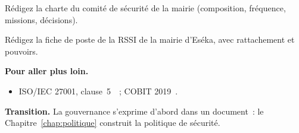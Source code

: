 \begin{boxexo}[title={\ding{45}\quad Exercice~4.9. Charte de comité \niveauexpert}]
Rédigez la charte du comité de sécurité de la mairie (composition, fréquence,
missions, décisions).
\end{boxexo}

\begin{boxexo}[title={\ding{45}\quad Exercice~4.10. Fiche de poste \niveauexpert}]
Rédigez la fiche de poste de la RSSI de la mairie d'Eséka, avec rattachement et
pouvoirs.
\end{boxexo}

\bigskip

\begin{boxinfo}
\textbf{Pour aller plus loin.}
\begin{itemize}
    \item ISO/IEC 27001, clause~5~\cite{iso27001}~; COBIT 2019~\cite{cobit2019}.
\end{itemize}
\end{boxinfo}

\begin{boxinfo}
\textbf{Transition.} La gouvernance s'exprime d'abord dans un document~: le
Chapitre~\ref{chap:politique} construit la politique de sécurité.
\end{boxinfo}

